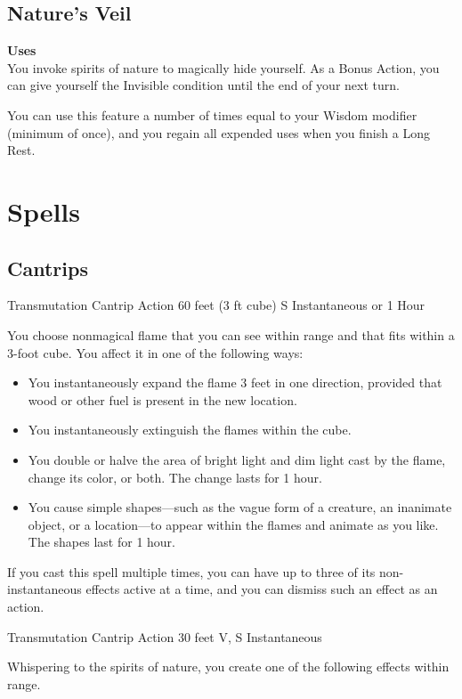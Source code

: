 \documentclass[letterpaper,openany,oneside,twocolumn]{book}
\begin{document}
\subsection*{Nature's Veil}
\textbf{ Uses}\\
You invoke spirits of nature to magically hide yourself. As a Bonus Action, you can give yourself the Invisible condition until the end of your next turn.

You can use this feature a number of times equal to your Wisdom modifier (minimum of once), and you regain all expended uses when you finish a Long Rest.

\section*{Spells}

\subsection*{Cantrips}
	{Transmutation Cantrip}
	{Action}
	{60 feet (3 ft cube)}
	{S}
	{Instantaneous or 1 Hour}

You choose nonmagical flame that you can see within range and that fits within a 3-foot cube. You affect it in one of the following ways:
\begin{itemize}
	\item You instantaneously expand the flame 3 feet in one direction, provided that wood or other fuel is present in the new location.
	\item You instantaneously extinguish the flames within the cube.
	\item You double or halve the area of bright light and dim light cast by the flame, change its color, or both. The change lasts for 1 hour.
	\item You cause simple shapes—such as the vague form of a creature, an inanimate object, or a location—to appear within the flames and animate as you like. The shapes last for 1 hour.
\end{itemize}
If you cast this spell multiple times, you can have up to three of its non-instantaneous effects active at a time, and you can dismiss such an effect as an action.

	{Transmutation Cantrip}
	{Action}
	{30 feet}
	{V, S}
	{Instantaneous}

Whispering to the spirits of nature, you create one of the following effects within range.
\end{document}
